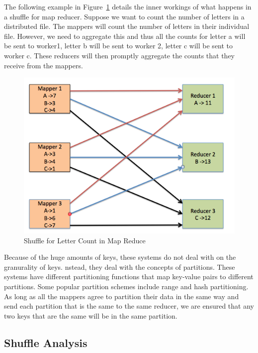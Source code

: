 The following example in Figure~\ref{fig:shuffle_basic} details the inner workings 
of what happens in a shuffle for map reducer. Suppose we want to count the 
number of letters in a distributed file. The mappers will count the number of
letters in their individual file. However, we need to aggregate this and 
thus all the counts for letter a will be sent to worker1, letter b will be sent to worker 2,
letter c will be sent to worker c. These reducers will then promptly aggregate the counts that they receive from the 
mappers.

\begin{figure}[h]
\begin{center}
\includegraphics[scale=1.0]{./img/shuffle_basic.png}
\caption{Shuffle for Letter Count in Map Reduce}
\label{fig:shuffle_basic}
\end{center}
\end{figure}

Because of the huge amounts of keys, these systems do not deal with on the granurality of keys.
nstead, they deal with the concepts of partitions. These systems have different partitioning functions
that map key-value pairs to different partitions. Some popular partition schemes include range and hash partitioning.
As long as all the mappers agree to partition their data in the same way and send each partition that is the same to the same reducer, we are ensured that any two keys that are the same will be in the same partition. 

\subsection {Shuffle Analysis}


